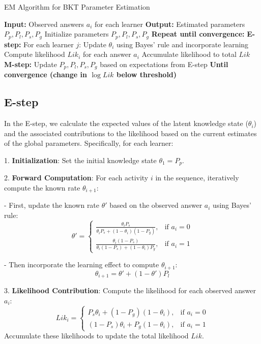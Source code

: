 \documentclass{article}
\begin{document}
\begin{algorithm}

\caption{EM Algorithm for BKT Parameter Estimation}
\begin{algorithmic}[1]
\STATE \textbf{Input:} Observed answers \(a_i\) for each learner
\STATE \textbf{Output:} Estimated parameters \(P_p, P_l, P_s, P_g\)
\STATE Initialize parameters \(P_p, P_l, P_s, P_g\)
\STATE \textbf{Repeat until convergence:}
    \STATE \quad \textbf{E-step:}
    \STATE \quad \quad For each learner \(j\):
    \STATE \quad \quad \quad Update \(\theta_i\) using Bayes' rule and incorporate learning
    \STATE \quad \quad \quad Compute likelihood \(Lik_i\) for each answer \(a_i\)
    \STATE \quad \quad \quad Accumulate likelihood to total \(Lik\)
    \STATE \quad \textbf{M-step:}
    \STATE \quad \quad Update \(P_p, P_l, P_s, P_g\) based on expectations from E-step
\STATE \textbf{Until convergence (change in \(\log Lik\) below threshold)}
\end{algorithmic}
\label{al:1}
\end{algorithm}

\subsection{E-step}
In the E-step, we calculate the expected values of the latent knowledge state (\(\theta_i\)) and the associated contributions to the likelihood based on the current estimates of the global parameters. Specifically, for each learner:

1. \textbf{Initialization}:
Set the initial knowledge state \(\theta_1 = P_p\).

2. \textbf{Forward Computation}:
For each activity \(i\) in the sequence, iteratively compute the known rate \(\theta_{i+1}\):

- First, update the known rate \(\theta'\) based on the observed answer \(a_i\) using Bayes' rule:
\[
\theta' = 
\begin{cases} 
    \frac{\theta_i P_s}{\theta_i P_s + (1 - \theta_i)(1 - P_g)}, & \text{if } a_i = 0 \\
    \frac{\theta_i (1 - P_s)}{\theta_i (1 - P_s) + (1 - \theta_i)P_g}, & \text{if } a_i = 1
\end{cases}
\]

- Then incorporate the learning effect to compute \(\theta_{i+1}\):
\[
\theta_{i+1} = \theta' + (1 - \theta')P_l
\]

3. \textbf{Likelihood Contribution}:
Compute the likelihood for each observed answer \(a_i\):
\[
Lik_i = 
\begin{cases} 
    P_s \theta_i + (1 - P_g)(1 - \theta_i), & \text{if } a_i = 0 \\
    (1 - P_s)\theta_i + P_g(1 - \theta_i), & \text{if } a_i = 1
\end{cases}
\]
Accumulate these likelihoods to update the total likelihood \(Lik\).
\end{document}

